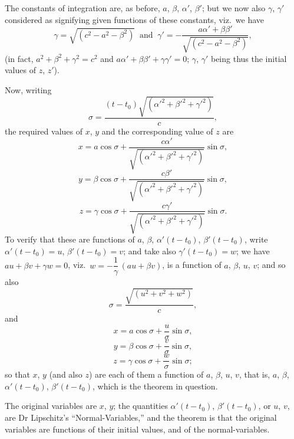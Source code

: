 \documentclass[11pt]{article}
\begin{document}
The constants of integration are, as before, $a$, $\beta$, $\alpha'$, $\beta'$; but we now also $\gamma$, $\gamma'$ considered as signifying given functions of these constants, viz.\ we have
\[
\gamma = \sqrt{(c^{2} - a^{2} - \beta^{2})}\ \text{ and }\ \gamma' = -\frac{a\alpha' + \beta\beta'}{\sqrt{(c^{2} - a^{2} - \beta^{2})}},
\]
(in fact, $a^{2} + \beta^{2} + \gamma^{2} = c^{2}$ and $a\alpha' + \beta\beta' + \gamma\gamma' = 0$; $\gamma$, $\gamma'$ being thus the initial values of $z$, $z'$).

Now, writing
\[
\sigma = \frac{(t - t_{0})\sqrt{(\alpha'^{2} + \beta'^{2} + \gamma'^{2})}}{c},
\]
the required values of $x$, $y$ and the corresponding value of $z$ are
\[
x = a\cos\sigma + \frac{c\alpha'}{\sqrt{(\alpha'^{2} + \beta'^{2} + \gamma'^{2})}}\sin\sigma,
\]
\[
y = \beta\cos\sigma + \frac{c\beta'}{\sqrt{(\alpha'^{2} + \beta'^{2} + \gamma'^{2})}}\sin\sigma,
\]
\[
z = \gamma\cos\sigma + \frac{c\gamma'}{\sqrt{(\alpha'^{2} + \beta'^{2} + \gamma'^{2})}}\sin\sigma.
\]
To verify that these are functions of $a$, $\beta$, $\alpha'(t - t_{0})$, $\beta'(t - t_{0})$, write $\alpha'(t - t_{0}) = u$, $\beta'(t - t_{0}) = v$; and take also $\gamma'(t - t_{0}) = w$; we have $a u + \beta v + \gamma w = 0$, viz.\ $w = -\dfrac{1}{\gamma}\,(a u + \beta v)$, is a function of $a$, $\beta$, $u$, $v$; and so also
\[
\sigma = \frac{\sqrt{(u^{2} + v^{2} + w^{2})}}{c},
\]
and
\[
x = a\cos\sigma + \frac{u}{\sigma}\sin\sigma,
\]
\[
y = \beta\cos\sigma + \frac{v}{\sigma}\sin\sigma,
\]
\[
z = \gamma\cos\sigma + \frac{w}{\sigma}\sin\sigma;
\]
so that $x$, $y$ (and also $z$) are each of them a function of $a$, $\beta$, $u$, $v$, that is, $a$, $\beta$, $\alpha'(t - t_{0})$, $\beta'(t - t_{0})$, which is the theorem in question.

The original variables are $x$, $y$; the quantities $\alpha'(t - t_{0})$, $\beta'(t - t_{0})$, or $u$, $v$, are Dr Lipschitz's ``Normal-Variables,'' and the theorem is that the original variables are functions of their initial values, and of the normal-variables.
\end{document}
